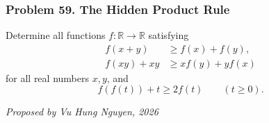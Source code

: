 \subsubsection*{Problem 59. The Hidden Product Rule}

\begin{exercisebox}[hard]

Determine all functions $f:\mathbb R\to\mathbb R$ satisfying
\[
\boxed{
\begin{aligned}
f(x+y)&\ge f(x)+f(y),\\
f(xy)+xy&\ge x f(y)+y f(x)
\end{aligned}}
\]
for all real numbers $x,y$, and
\[
\boxed{\qquad
f(f(t))+t\ge2f(t)
\qquad(t\ge0).
\qquad}
\]

\begin{flushright}
\textit{Proposed by Vu Hung Nguyen, 2026}
\end{flushright}


\end{exercisebox}
